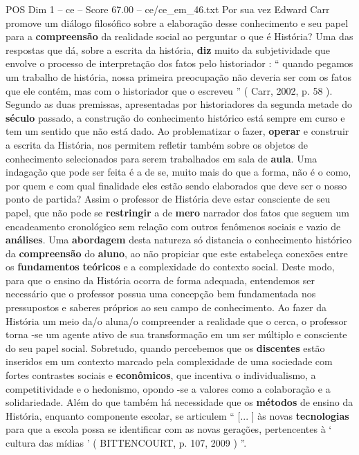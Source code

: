 \begin{textsample}{POS Dim 1 – ce – Score 67.00 – ce/ce\_em\_46.txt}
Por sua vez Edward Carr promove um diálogo filosófico sobre a elaboração desse conhecimento e seu papel para a \textbf{compreensão} da realidade social ao perguntar o que é História?
Uma das respostas que dá, sobre a escrita da história, \textbf{diz} muito da subjetividade que envolve o processo de interpretação dos fatos pelo historiador : “ quando pegamos um trabalho de história, nossa primeira preocupação não deveria ser com os fatos que ele contém, mas com o historiador que o escreveu ” ( Carr, 2002, p. 58 ).
Segundo as duas premissas, apresentadas por historiadores da segunda metade do \textbf{século} passado, a construção do conhecimento histórico está sempre em curso e tem um sentido que não está dado.
Ao problematizar o fazer, \textbf{operar} e construir a escrita da História, nos permitem refletir também sobre os objetos de conhecimento selecionados para serem trabalhados em sala de \textbf{aula}.
Uma indagação que pode ser feita é a de se, muito mais do que a forma, não é o como, por quem e com qual finalidade eles estão sendo elaborados que deve ser o nosso ponto de partida?
Assim o professor de História deve estar consciente de seu papel, que não pode se \textbf{restringir} a de \textbf{mero} narrador dos fatos que seguem um encadeamento cronológico sem relação com outros fenômenos sociais e vazio de \textbf{análises}.
Uma \textbf{abordagem} desta natureza só distancia o conhecimento histórico da \textbf{compreensão} do \textbf{aluno}, ao não propiciar que este estabeleça conexões entre os \textbf{fundamentos} \textbf{teóricos} e a complexidade do contexto social.
Deste modo, para que o ensino da História ocorra de forma adequada, entendemos ser necessário que o professor possua uma concepção bem fundamentada nos pressupostos e saberes próprios ao seu campo de conhecimento.
Ao fazer da História um meio da/o aluna/o compreender a realidade que o cerca, o professor torna -se um agente ativo de sua transformação em um ser múltiplo e consciente do seu papel social.
Sobretudo, quando percebemos que os \textbf{discentes} estão inseridos em um contexto marcado pela complexidade de uma sociedade com fortes contrastes sociais e \textbf{econômicos}, que incentiva o individualismo, a competitividade e o hedonismo, opondo -se a valores como a colaboração e a solidariedade.
Além do que também há necessidade que os \textbf{métodos} de ensino da História, enquanto componente escolar, se articulem “ [... ] às novas \textbf{tecnologias} para que a escola possa se identificar com as novas gerações, pertencentes à ‘ cultura das mídias ’ ( BITTENCOURT, p. 107, 2009 ) ”.

\end{textsample}

